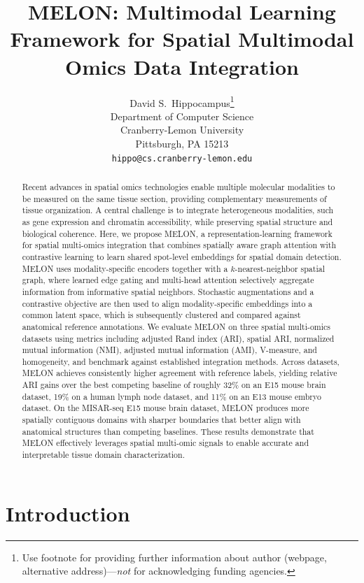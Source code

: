 \documentclass{article}
\title{MELON: Multimodal Learning Framework for Spatial Multimodal Omics Data Integration}
\author{%
  David S.~Hippocampus\thanks{Use footnote for providing further information
    about author (webpage, alternative address)---\emph{not} for acknowledging
  funding agencies.} \\
  Department of Computer Science\\
  Cranberry-Lemon University\\
  Pittsburgh, PA 15213 \\
  \texttt{hippo@cs.cranberry-lemon.edu} \\
}
\theoremstyle{plain}
\theoremstyle{definition}
\begin{document}
\maketitle

\begin{abstract}
  Recent advances in spatial omics technologies enable multiple molecular modalities to be measured on the same tissue section, providing
  complementary measurements of tissue organization. A central challenge is to integrate heterogeneous modalities, such as gene expression and chromatin accessibility, while preserving spatial structure and biological coherence. Here, we propose MELON, a representation-learning framework for spatial multi-omics integration that combines spatially aware graph attention with contrastive learning to learn shared spot-level embeddings for spatial domain detection. MELON uses modality-specific encoders together with a $k$-nearest-neighbor spatial graph, where learned edge gating and multi-head attention selectively aggregate information from informative spatial neighbors. Stochastic
  augmentations and a contrastive objective are then used to align modality-specific embeddings into a common latent space, which is subsequently clustered and compared against anatomical reference annotations. We evaluate MELON on three spatial multi-omics datasets using metrics including adjusted Rand index (ARI), spatial ARI, normalized mutual
  information (NMI), adjusted mutual information (AMI), V-measure, and homogeneity, and benchmark against established integration methods. Across datasets, MELON achieves consistently higher agreement with reference labels, yielding relative ARI gains over the best competing baseline of roughly 32\% on an E15 mouse brain dataset, 19\% on a human lymph node dataset, and 11\% on an E13 mouse embryo dataset. On the MISAR-seq E15 mouse brain dataset, MELON produces more spatially contiguous domains with sharper boundaries that better align with anatomical structures than competing baselines. These results demonstrate that MELON effectively leverages spatial multi-omic signals to enable accurate and interpretable tissue domain characterization.
\end{abstract}

\section{Introduction}
\end{document}
